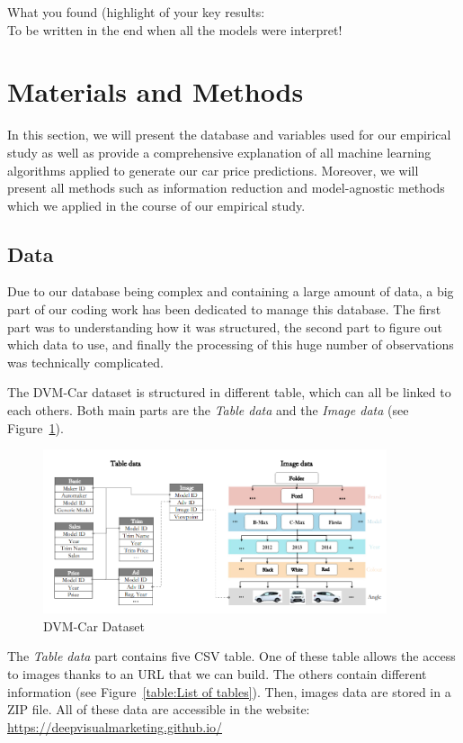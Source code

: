 \documentclass[12pt]{article}
\begin{document}
\noindent What you found (highlight of your key results: \\
\noindent To be written in the end when all the models were interpret!


\section{Materials and Methods}
In this section, we will present the database and variables used for our empirical study as well as provide a comprehensive explanation of all machine learning algorithms applied to generate our car price predictions. Moreover, we will present all methods such as information reduction and model-agnostic methods which we applied in the course of our empirical study.

\subsection{Data}
\noindent Due to our database being complex and containing a large amount of data, a big part of our coding work has been dedicated to manage this database. The first part was to understanding how it was structured, the second part to figure out which data to use, and finally the processing of this huge number of observations was technically complicated.

\noindent The DVM-Car dataset is structured in different table, which can all be linked to each others. Both main parts are the \textit{Table data} and the \textit{Image data} (see Figure~\ref{table:DVM-Car Dataset}). 


\FloatBarrier
\begin{figure}[ht]
    \centering
    \includegraphics[width=0.9\textwidth]{general_data_tables.png}
    \caption{DVM-Car Dataset}
    \label{table:DVM-Car Dataset}
\end{figure}
\FloatBarrier


\noindent The \textit{Table data} part contains five CSV table. One of these table allows the access to images thanks to an URL that we can build. The others contain different information (see Figure~\ref{table:List of tables}). 
Then, images data are stored in a ZIP file. 
All of these data are accessible in the website: \url{https://deepvisualmarketing.github.io/}
\end{document}
